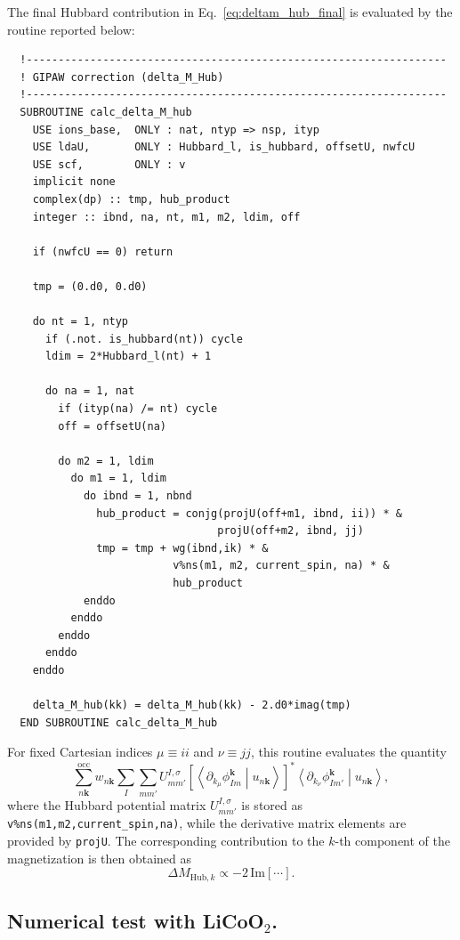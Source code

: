 \documentclass[11pt]{article}
\newcommand{\kk}{k}
\begin{document}
The final Hubbard contribution in Eq.~\eqref{eq:deltam_hub_final} is evaluated by the routine reported below:
\begin{verbatim}
  !------------------------------------------------------------------
  ! GIPAW correction (delta_M_Hub)
  !------------------------------------------------------------------
  SUBROUTINE calc_delta_M_hub
    USE ions_base,  ONLY : nat, ntyp => nsp, ityp
    USE ldaU,       ONLY : Hubbard_l, is_hubbard, offsetU, nwfcU
    USE scf,        ONLY : v
    implicit none
    complex(dp) :: tmp, hub_product
    integer :: ibnd, na, nt, m1, m2, ldim, off

    if (nwfcU == 0) return

    tmp = (0.d0, 0.d0)

    do nt = 1, ntyp
      if (.not. is_hubbard(nt)) cycle
      ldim = 2*Hubbard_l(nt) + 1

      do na = 1, nat
        if (ityp(na) /= nt) cycle
        off = offsetU(na)

        do m2 = 1, ldim
          do m1 = 1, ldim
            do ibnd = 1, nbnd
              hub_product = conjg(projU(off+m1, ibnd, ii)) * &
                                 projU(off+m2, ibnd, jj)
              tmp = tmp + wg(ibnd,ik) * &
                          v%ns(m1, m2, current_spin, na) * &
                          hub_product
            enddo
          enddo
        enddo
      enddo
    enddo

    delta_M_hub(kk) = delta_M_hub(kk) - 2.d0*imag(tmp)
  END SUBROUTINE calc_delta_M_hub
\end{verbatim}

For fixed Cartesian indices \(\mu \equiv ii\) and \(\nu \equiv jj\), this routine evaluates the quantity
\[
\sum_{n\mathbf{k}}^{\mathrm{occ}} w_{n\mathbf{k}}
\sum_I \sum_{mm'}
U_{mm'}^{I,\sigma}
\left[
\left\langle \partial_{k_\mu} \phi_{Im}^{\mathbf{k}} \middle| u_{n\mathbf{k}} \right\rangle
\right]^*
\left\langle \partial_{k_\nu} \phi_{Im'}^{\mathbf{k}} \middle| u_{n\mathbf{k}} \right\rangle ,
\]
where the Hubbard potential matrix \(U_{mm'}^{I,\sigma}\) is stored as
\texttt{v\%ns(m1,m2,current\_spin,na)}, while the derivative matrix elements are provided by \texttt{projU}. The corresponding contribution to the \(\kk\)-th component of the magnetization is then obtained as
\[
\Delta M_{\mathrm{Hub},\kk} \propto -2\,\mathrm{Im}\!\left[\cdots\right].
\]



\subsection{Numerical test with LiCoO$_2$.}
\end{document}
